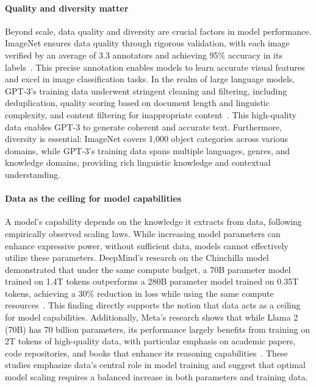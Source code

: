 \paragraph{Quality and diversity matter}
Beyond scale, data quality and diversity are crucial factors in model performance. ImageNet ensures data quality through rigorous validation, with each image verified by an average of 3.3 annotators and achieving 95\% accuracy in its labels~\cite{deng2009imagenet}. This precise annotation enables models to learn accurate visual features and excel in image classification tasks. In the realm of large language models, GPT-3's training data underwent stringent cleaning and filtering, including deduplication, quality scoring based on document length and linguistic complexity, and content filtering for inappropriate content~\cite{brown2020language}. This high-quality data enables GPT-3 to generate coherent and accurate text. Furthermore, diversity is essential: ImageNet covers 1,000 object categories across various domains, while GPT-3's training data spans multiple languages, genres, and knowledge domains, providing rich linguistic knowledge and contextual understanding.

\paragraph{Data as the ceiling for model capabilities}
A model's capability depends on the knowledge it extracts from data, following empirically observed scaling laws. While increasing model parameters can enhance expressive power, without sufficient data, models cannot effectively utilize these parameters. DeepMind's research on the Chinchilla model demonstrated that under the same compute budget, a 70B parameter model trained on 1.4T tokens outperforms a 280B parameter model trained on 0.35T tokens, achieving a 30\% reduction in loss while using the same compute resources~\cite{hoffmann2022training}. This finding directly supports the notion that data acts as a ceiling for model capabilities. Additionally, Meta's research shows that while Llama 2 (70B) has 70 billion parameters, its performance largely benefits from training on 2T tokens of high-quality data, with particular emphasis on academic papers, code repositories, and books that enhance its reasoning capabilities~\cite{touvron2023llama}. These studies emphasize data's central role in model training and suggest that optimal model scaling requires a balanced increase in both parameters and training data.

